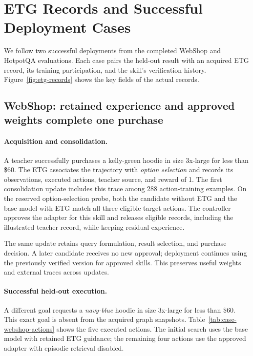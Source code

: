 \section{ETG Records and Successful Deployment Cases}
\label{app:cases}
We follow two successful deployments from the completed WebShop and HotpotQA evaluations. Each case pairs the held-out result with an acquired ETG record, its training participation, and the skill's verification history. Figure~\ref{fig:etg-records} shows the key fields of the actual records.


\subsection{WebShop: retained experience and approved weights complete one purchase}
\label{app:case-webshop}
\paragraph{Acquisition and consolidation.}
A teacher successfully purchases a kelly-green hoodie in size 3x-large for less than \$60. The ETG associates the trajectory with \emph{option selection} and records its observations, executed actions, teacher source, and reward of 1. The first consolidation update includes this trace among 288 action-training examples. On the reserved option-selection probe, both the candidate without ETG and the base model with ETG match all three eligible target actions. The controller approves the adapter for this skill and releases eligible records, including the illustrated teacher record, while keeping residual experience.

The same update retains query formulation, result selection, and purchase decision. A later candidate receives no new approval; deployment continues using the previously verified version for approved skills. This preserves useful weights and external traces across updates.

\paragraph{Successful held-out execution.}
A different goal requests a \emph{navy-blue} hoodie in size 3x-large for less than \$60. This exact goal is absent from the acquired graph snapshots. Table~\ref{tab:case-webshop-actions} shows the five executed actions. The initial search uses the base model with retained ETG guidance; the remaining four actions use the approved adapter with episodic retrieval disabled.

